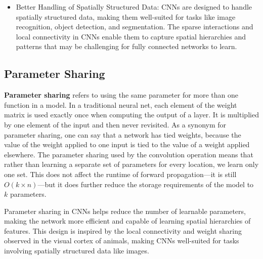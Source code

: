 \documentclass{report}
\begin{document}
\begin{itemize}
\item Better Handling of Spatially Structured Data:
CNNs are designed to handle spatially structured data, making them well-suited for tasks like image recognition, object detection, and segmentation. The sparse interactions and local connectivity in CNNs enable them to capture spatial hierarchies and patterns that may be challenging for fully connected networks to learn.
\end{itemize}

\subsection{Parameter Sharing}
\textbf{Parameter sharing} refers to using the same parameter for more than one function in a model. In a traditional neural net, each element of the weight matrix is used exactly once when computing the output of a layer. It is multiplied by one element of the input and then never revisited. As a synonym for parameter sharing, one can say that a network has tied weights, because the value of the weight applied to one input is tied to the value of a weight applied elsewhere. The parameter sharing used by the convolution operation means that rather than learning a separate set of parameters for every location, we learn only one set. This does not affect the runtime of forward propagation—it is still $O(k \times n)$—but it does further reduce the storage requirements of the model to $k$ parameters.

Parameter sharing in CNNs helps reduce the number of learnable parameters, making the network more efficient and capable of learning spatial hierarchies of features. This design is inspired by the local connectivity and weight sharing observed in the visual cortex of animals, making CNNs well-suited for tasks involving spatially structured data like images.
\end{document}
